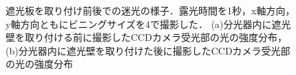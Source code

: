 \begin{figure}
    \caption{遮光板を取り付け前後での迷光の様子．露光時間を1秒，x軸方向，y軸方向ともにビニングサイズを4で撮影した．
    (a)分光器内に遮光壁を取り付ける前に撮影したCCDカメラ受光部の光の強度分布，
    (b)分光器内に遮光壁を取り付けた後に撮影したCCDカメラ受光部の光の強度分布}
    \label{fig:meikou}
\end{figure}



